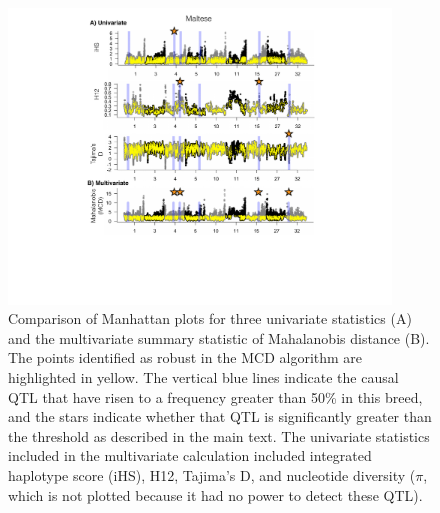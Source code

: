 \documentclass[12pt, oneside]{amsart}
\begin{document}
\newpage
\begin{figure}[h]
\begin{center}
\includegraphics[width=4in]{../figures_man2/F5-MalteseManhattan.pdf}
\end{center}
\caption[]{Comparison of Manhattan plots for three univariate statistics (A) and the multivariate summary statistic of Mahalanobis distance (B). The points identified as robust in the MCD algorithm are highlighted in yellow. The vertical blue lines indicate the causal QTL that have risen to a frequency greater than 50\% in this breed, and the stars indicate whether that QTL is significantly greater than the threshold as described in the main text. The univariate statistics included in the multivariate calculation included integrated haplotype score (iHS), H12, Tajima's D, and nucleotide diversity ($\pi$, which is not plotted because it had no power to detect these QTL).} 
 \label{fig:???}
\end{figure}
\end{document}
